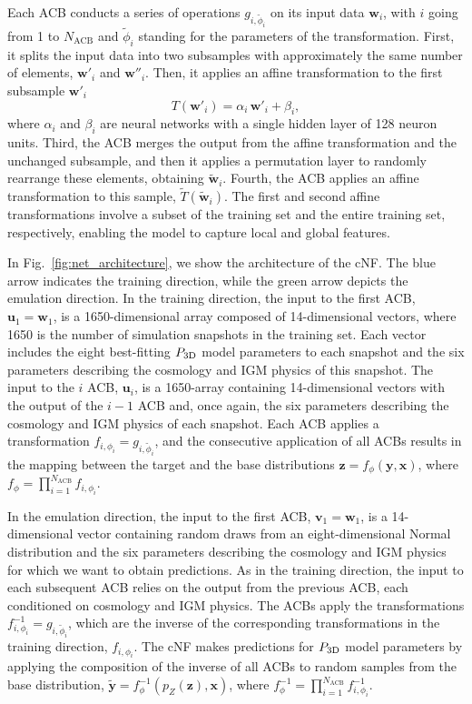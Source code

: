 \documentclass[longauth]{aa}
\newcommand{\pthreed}{\ensuremath{P_{\rm 3D}}\xspace}
\begin{document}
Each ACB conducts a series of operations $g_{i,\tilde{\phi}_i}$ on its input data $\mathbf{w}_i$, with $i$ going from 1 to $N_\mathrm{ACB}$ and $\tilde{\phi}_i$ standing for the parameters of the transformation. First, it splits the input data into two subsamples with approximately the same number of elements, $\mathbf{w'}_i$ and $\mathbf{w''}_i$. Then, it applies an affine transformation to the first subsample $\mathbf{w'}_i$
%
\begin{equation}
    T(\mathbf{w'}_i)=\alpha_i\, \mathbf{w'}_i + \beta_i,
\end{equation}
%
where $\alpha_i$ and $\beta_i$ are neural networks with a single hidden layer of 128 neuron units. Third, the ACB merges the output from the affine transformation and the unchanged subsample, and then it applies a permutation layer to randomly rearrange these elements, obtaining $\mathbf{\tilde{w}}_i$. Fourth, the ACB applies an affine transformation to this sample, $\tilde{T}(\mathbf{\tilde{w}}_i)$. The first and second affine transformations involve a subset of the training set and the entire training set, respectively, enabling the model to capture local and global features.

In Fig.~\ref{fig:net_architecture}, we show the architecture of the cNF. The blue arrow indicates the training direction, while the green arrow depicts the emulation direction. In the training direction, the input to the first ACB, $\mathbf{u}_1=\mathbf{w}_1$, is a 1650-dimensional array composed of 14-dimensional vectors, where 1650 is the number of simulation snapshots in the training set. Each vector includes the eight best-fitting \pthreed model parameters to each snapshot and the six parameters describing the cosmology and IGM physics of this snapshot. The input to the $i$ ACB, $\mathbf{u}_i$, is a 1650-array containing 14-dimensional vectors with the output of the $i-1$ ACB and, once again, the six parameters describing the cosmology and IGM physics of each snapshot. Each ACB applies a transformation $f_{i,\phi_i}=g_{i,\tilde{\phi}_i}$, and the consecutive application of all ACBs results in the mapping between the target and the base distributions $\mathbf{z}=f_\phi(\mathbf{y}, \mathbf{x})$, where $f_\phi = \prod_{i=1}^{N_\mathrm{ACB}} f_{i,\phi_i}$.

In the emulation direction, the input to the first ACB, $\mathbf{v}_1=\mathbf{w}_1$, is a 14-dimensional vector containing random draws from an eight-dimensional Normal distribution and the six parameters describing the cosmology and IGM physics for which we want to obtain predictions. As in the training direction, the input to each subsequent ACB relies on the output from the previous ACB, each conditioned on cosmology and IGM physics. The ACBs apply the transformations $f^{-1}_{i,\phi_i}=g_{i,\tilde{\phi}_i}$, which are the inverse of the corresponding transformations in the training direction, $f_{i,\phi_i}$. The cNF makes predictions for \pthreed model parameters by applying the composition of the inverse of all ACBs to random samples from the base distribution, $\mathbf{\tilde{y}}=f_\phi^{-1}(p_{Z}(\mathbf{z}), \mathbf{x})$, where $f_\phi^{-1} = \prod_{i=1}^{N_\mathrm{ACB}} f_{i,\phi_i}^{-1}$.
\end{document}
